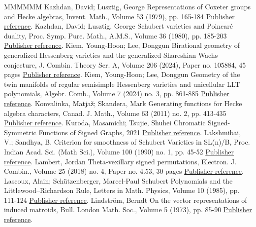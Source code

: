 \begin{thebibliography}{MMMMMM}
 Kazhdan, David; Lusztig, George Representations of Coxeter groups and Hecke algebras, Invent. Math., Volume 53 (1979), pp. 165-184 \href{https://alco.centre-mersenne.org/articles/10.5802/alco.459/#KLRepCH}{Publisher reference}.
 Kazhdan, David; Lusztig, George Schubert varieties and Poincaré duality, Proc. Symp. Pure. Math., A.M.S., Volume 36 (1980), pp. 185-203 \href{https://alco.centre-mersenne.org/articles/10.5802/alco.459/#KLSchub}{Publisher reference}.
 Kiem, Young-Hoon; Lee, Donggun Birational geometry of generalized Hessenberg varieties and the generalized Shareshian-Wachs conjecture, J. Combin. Theory Ser. A, Volume 206 (2024), Paper no. 105884, 45 pages \href{https://alco.centre-mersenne.org/articles/10.5802/alco.459/#KiemLeeBirational}{Publisher reference}.
 Kiem, Young-Hoon; Lee, Donggun Geometry of the twin manifolds of regular semisimple Hessenberg varieties and unicellular LLT polynomials, Algebr. Comb., Volume 7 (2024) no. 3, pp. 861-885 \href{https://alco.centre-mersenne.org/articles/10.5802/alco.459/#KiemLeeTwin}{Publisher reference}.
 Konvalinka, Matjaž; Skandera, Mark Generating functions for Hecke algebra characters, Canad. J. Math., Volume 63 (2011) no. 2, pp. 413-435 \href{https://alco.centre-mersenne.org/articles/10.5802/alco.459/#KSkanQGJ}{Publisher reference}.
 Kuroda, Masamichi; Tsujie, Shuhei Chromatic Signed-Symmetric Functions of Signed Graphs, 2021 \href{https://alco.centre-mersenne.org/articles/10.5802/alco.459/#KurTsuChrom}{Publisher reference}.
 Lakshmibai, V.; Sandhya, B. Criterion for smoothness of Schubert Varieties in SL(n)/B, Proc. Indian Acad. Sci. (Math Sci.), Volume 100 (1990) no. 1, pp. 45-52 \href{https://alco.centre-mersenne.org/articles/10.5802/alco.459/#LakSan}{Publisher reference}.
 Lambert, Jordan Theta-vexillary signed permutations, Electron. J. Combin., Volume 25 (2018) no. 4, Paper no. 4.53, 30 pages \href{https://alco.centre-mersenne.org/articles/10.5802/alco.459/#LambertTheta}{Publisher reference}.
 Lascoux, Alain; Schützenberger, Marcel-Paul Schubert Polynomials and the Littlewood–Richardson Rule, Letters in Math. Physics, Volume 10 (1985), pp. 111-124 \href{https://alco.centre-mersenne.org/articles/10.5802/alco.459/#LS2}{Publisher reference}.
 Lindström, Berndt On the vector representations of induced matroids, Bull. London Math. Soc., Volume 5 (1973), pp. 85-90 \href{https://alco.centre-mersenne.org/articles/10.5802/alco.459/#LinVrep}{Publisher reference}.

\end{thebibliography}
